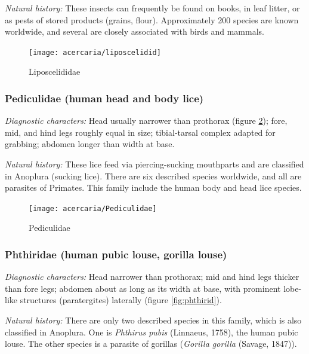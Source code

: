 \noindent{}\textit{Natural history:} These insects can frequently be found on books, in leaf litter, or as pests of stored products (grains, flour). Approximately 200 species are known worldwide, and several are closely associated with birds and mammals.\vspace{3mm}

\begin{figure}[ht!]
 \centering
 \texttt{[image: acercaria/liposcelidid]}
 \caption{Liposcelididae \citep[redrawn from][Fig. 34]{Howard029686434}}
 \label{fig:liposcelidid}
\end{figure}

\subsubsection{Pediculidae (human head and body lice)}
\noindent{}\textit{Diagnostic characters:} Head usually narrower than prothorax (figure \ref{fig:pediculid}); fore, mid, and hind legs roughly equal in size; tibial-tarsal complex adapted for grabbing; abdomen longer than width at base.\vspace{3mm}

\noindent{}\textit{Natural history:} These lice feed via piercing-sucking mouthparts and are classified in Anoplura (sucking lice). There are six described species worldwide, and all are parasites of Primates. This family include the human body and head lice species.\vspace{3mm}

\begin{figure}[ht!]
 \centering
 \texttt{[image: acercaria/Pediculidae]}
 \caption{Pediculidae \citep[redrawn from][Fig. 13A]{snodgrass1944feeding}}
 \label{fig:pediculid}
\end{figure}

\subsubsection{Phthiridae (human pubic louse, gorilla louse)}
\noindent{}\textit{Diagnostic characters:} Head narrower than prothorax; mid and hind legs thicker than fore legs; abdomen about as long as its width at base, with prominent lobe-like structures (paratergites) laterally (figure \ref{fig:phthirid}).\vspace{3mm}

\noindent{}\textit{Natural history:} There are only two described species in this family, which is also classified in Anoplura. One is \textit{Phthirus pubis} (Linnaeus, 1758), the human pubic louse. The other species is a parasite of gorillas (\textit{Gorilla gorilla} (Savage, 1847)).\vspace{3mm}


